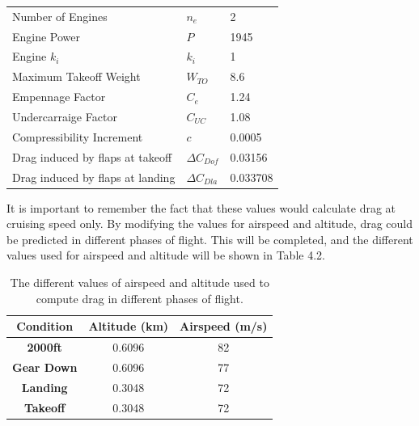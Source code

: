 \documentclass[stu, a4paper, 12pt, floatsintext]{apa7}
\numberwithin{figure}{section}
\numberwithin{table}{section}
\numberwithin{equation}{section}
\begin{document}
\begin{table}[H]
\begin{tabular}{@{}lll@{}}
    Number of Engines                      & $n_e$                                            & 2                                                   \\
    Engine Power                           & $P$                                              & 1945                                                \\
    Engine $k_i$                           & $k_i$                                            & 1                                                   \\
    Maximum Takeoff Weight                 & $W_{TO}$                                         & 8.6                                                 \\
    Empennage Factor                       & $C_e$                                            & 1.24                                                \\
    Undercarraige Factor                   & $C_{UC}$                                         & 1.08                                                \\
    Compressibility Increment              & $c$                                              & 0.0005                                              \\
    Drag induced by flaps at takeoff       & $\Delta C_{Dof}$                                 & 0.03156                                             \\
    Drag induced by flaps at landing       & $\Delta C_{Dla}$                                 & 0.033708                                            \\ \bottomrule
    \end{tabular}
\end{table}

It is important to remember the fact that these values would calculate drag at cruising speed only. By modifying the values for airspeed and altitude, drag could be predicted in different phases of flight. This will be completed, and the different values used for airspeed and altitude will be shown in Table 4.2.

\begin{table}[H]
    \centering
    \caption{The different values of airspeed and altitude used to compute drag in different phases of flight.}
    \label{tab:drag_pred_phase_table}
    \begin{tabular}{@{}c c c @{}}
    \toprule
    \textbf{Condition} & \textbf{Altitude (km)} & \textbf{Airspeed (m/s)} \\ \midrule
    \textbf{2000ft}    & 0.6096                 & 82                      \\
    \textbf{Gear Down} & 0.6096                 & 77                      \\
    \textbf{Landing}   & 0.3048                 & 72                      \\
    \textbf{Takeoff}   & 0.3048                 & 72                      \\ \bottomrule
    \end{tabular}
\end{table}
\end{document}
